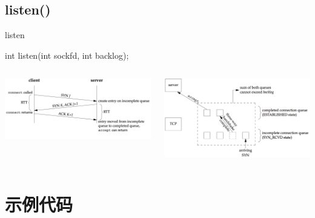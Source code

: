 \documentclass[UTF8]{beamer}
\begin{document}
\subsection{listen()}
\begin{frame}[fragile]{listen}
  \begin{ccode}
    int listen(int sockfd, int backlog);
  \end{ccode}
  \begin{columns}
    \pause
    \begin{column}{0.5\textwidth}
      \begin{center}
        \includegraphics[width=\textwidth]{img/3-way-handshake.png}
      \end{center}
    \end{column}
    \pause
    \begin{column}{0.5\textwidth}
      \begin{center}
        \includegraphics[width=\textwidth]{img/backlog.png}
      \end{center}
    \end{column}
  \end{columns}
\end{frame}
\section{示例代码}
\end{document}
